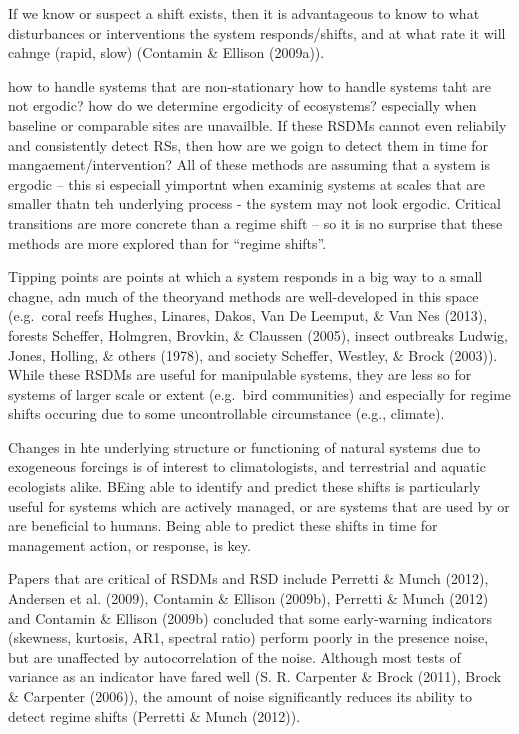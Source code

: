 \documentclass[12pt,twoside,openany]{reedthesis}
\begin{document}
If we know or suspect a shift exists, then it is advantageous to know to what disturbances or interventions the system responds/shifts, and at what rate it will cahnge (rapid, slow) (Contamin \& Ellison (2009a)).

how to handle systems that are non-stationary
how to handle systems taht are not ergodic?
how do we determine ergodicity of ecosystems? especially when baseline or comparable sites are unavailble.
If these RSDMs cannot even reliabily and consistently detect RSs, then how are we goign to detect them in time for mangaement/intervention?
All of these methods are assuming that a system is ergodic -- this si especiall yimportnt when examinig systems at scales that are smaller thatn teh underlying process - the system may not look ergodic.
Critical transitions are more concrete than a regime shift -- so it is no surprise that these methods are more explored than for ``regime shifts''.

Tipping points are points at which a system responds in a big way to a small chagne, adn much of the theoryand methods are well-developed in this space (e.g.~coral reefs Hughes, Linares, Dakos, Van De Leemput, \& Van Nes (2013), forests Scheffer, Holmgren, Brovkin, \& Claussen (2005), insect outbreaks Ludwig, Jones, Holling, \& others (1978), and society Scheffer, Westley, \& Brock (2003)). While these RSDMs are useful for manipulable systems, they are less so for systems of larger scale or extent (e.g.~bird communities) and especially for regime shifts occuring due to some uncontrollable circumstance (e.g., climate).

Changes in hte underlying structure or functioning of natural systems due to exogeneous forcings is of interest to climatologists, and terrestrial and aquatic ecologists alike. BEing able to identify and predict these shifts is particularly useful for systems which are actively managed, or are systems that are used by or are beneficial to humans. Being able to predict these shifts in time for management action, or response, is key.

Papers that are critical of RSDMs and RSD include Perretti \& Munch (2012), Andersen et al. (2009), Contamin \& Ellison (2009b), Perretti \& Munch (2012) and Contamin \& Ellison (2009b) concluded that some early-warning indicators (skewness, kurtosis, AR1, spectral ratio) perform poorly in the presence noise, but are unaffected by autocorrelation of the noise. Although most tests of variance as an indicator have fared well (S. R. Carpenter \& Brock (2011), Brock \& Carpenter (2006)), the amount of noise significantly reduces its ability to detect regime shifts (Perretti \& Munch (2012)).
\end{document}

